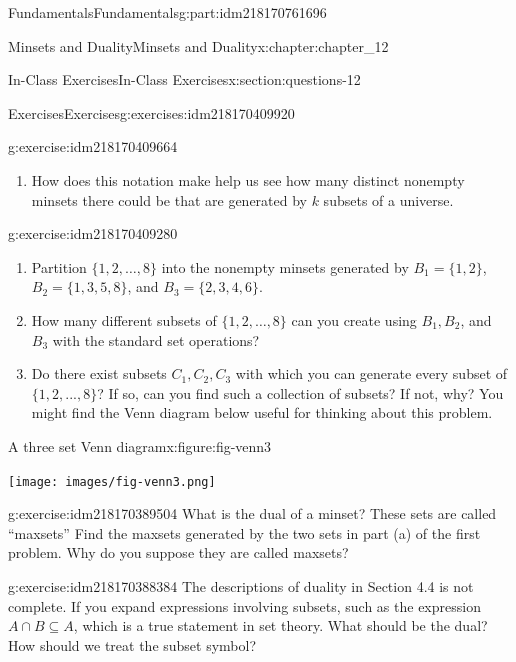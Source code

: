 \documentclass[oneside,10pt,]{book}
\numberwithin{equation}{section}
\begin{document}
\begin{partptx}{Fundamentals}{}{Fundamentals}{}{}{g:part:idm218170761696}
\begin{chapterptx}{Minsets and Duality}{}{Minsets and Duality}{}{}{x:chapter:chapter_12}
\begin{sectionptx}{In-Class Exercises}{}{In-Class Exercises}{}{}{x:section:questions-12}
\begin{exercises-subsection-numberless}{Exercises}{}{Exercises}{}{}{g:exercises:idm218170409920}
\begin{exercisegroup}
\begin{divisionexerciseeg}{1}{}{}{g:exercise:idm218170409664}
\begin{enumerate}[label=(\alph*)]
\item{}How does this notation make help us see how many distinct nonempty minsets there could be that are generated by \(k\) subsets of a universe.%
\end{enumerate}
%
\end{divisionexerciseeg}%
\begin{divisionexerciseeg}{2}{}{}{g:exercise:idm218170409280}%
%
\begin{enumerate}[label=(\alph*)]
\item{}Partition \(\{1, 2,  \dots, 8\}\) into the nonempty minsets generated by \(B_1= \{1, 2\}\), \(B_2 = \{1, 3, 5, 8\}\), and \(B_3 = \{2, 3, 4, 6\}\).%
\item{}How many different subsets of \(\{1, 2, \dots ,8\}\) can you create using \(B_1, B_2\), and \(B_3\) with the standard set operations?%
\item{}Do there exist subsets \(C_1, C_2, C_3\) with which you can generate every subset of \(\{1,2, . . . ,8\}\)?  If so, can you find such a collection of subsets?  If not, why?  You might find the Venn diagram below useful for thinking about this problem.%
\end{enumerate}
%
\begin{figureptx}{A three set Venn diagram}{x:figure:fig-venn3}{}%
\begin{image}{0.05}{0.9}{0.05}%
\texttt{[image: images/fig-venn3.png]}
\end{image}%
\tcblower
\end{figureptx}%
\end{divisionexerciseeg}%
\begin{divisionexerciseeg}{3}{}{}{g:exercise:idm218170389504}%
What is the dual of a minset?  These sets are called ``maxsets''  Find the maxsets generated by the two sets in part (a) of the first problem.   Why do you suppose they are called maxsets?%
\end{divisionexerciseeg}%
\begin{divisionexerciseeg}{4}{}{}{g:exercise:idm218170388384}%
The descriptions of duality in Section 4.4 is not complete.  If you expand expressions involving subsets, such as the expression \(A \cap B \subseteq A\), which is a true statement in set theory.  What should be the dual?  How should we treat the subset symbol?%
\end{divisionexerciseeg}%
\end{exercisegroup}
\par\medskip\noindent
\end{exercises-subsection-numberless}

\end{sectionptx}
\end{chapterptx}
\end{partptx}
\end{document}
